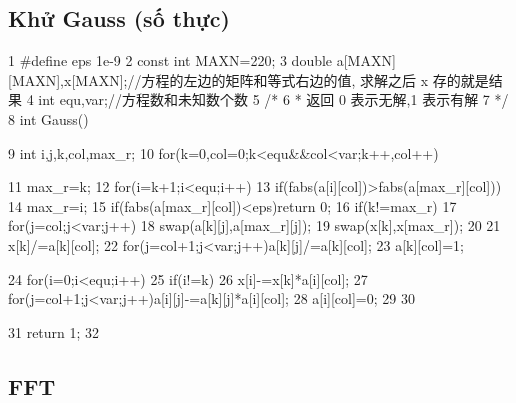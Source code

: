 \documentclass[11pt]{article}
\begin{document}
\subsection{Khử Gauss (số thực)}

\begin{Code}
 1 #define eps 1e-9
 2 const int MAXN=220;
 3 double a[MAXN][MAXN],x[MAXN];//方程的左边的矩阵和等式右边的值, 求解之后 x
      存的就是结果
 4 int equ,var;//方程数和未知数个数
 5 /*
 6 * 返回 0 表示无解,1 表示有解
 7 */
 8 int Gauss(){
 9     int i,j,k,col,max_r;
10     for(k=0,col=0;k<equ&&col<var;k++,col++){
11         max_r=k;
12         for(i=k+1;i<equ;i++)
13           if(fabs(a[i][col])>fabs(a[max_r][col]))
14              max_r=i;
15         if(fabs(a[max_r][col])<eps)return 0;
16         if(k!=max_r){
17              for(j=col;j<var;j++)
18                swap(a[k][j],a[max_r][j]);
19              swap(x[k],x[max_r]);
20         }
21         x[k]/=a[k][col];
22         for(j=col+1;j<var;j++)a[k][j]/=a[k][col];
23         a[k][col]=1;


24              for(i=0;i<equ;i++)
25                if(i!=k){
26                    x[i]-=x[k]*a[i][col];
27                    for(j=col+1;j<var;j++)a[i][j]-=a[k][j]*a[i][col];
28                    a[i][col]=0;
29                }
30       }
31       return 1;
32 }
\end{Code}

\subsection{FFT}
\end{document}
